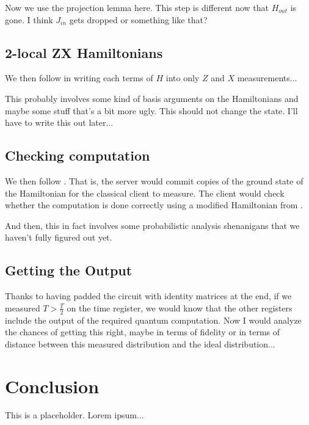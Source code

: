 \documentclass{article}
\theoremstyle{definition}
\begin{document}
Now we use the projection lemma here. This step is different now that $H_{out}$ is gone. I think $J_{in}$ gets dropped or something like that?

\subsection{2-local ZX Hamiltonians}

We then follow \cite{biamonte_love_2008} in writing each terms of $H$ into only $Z$ and $X$ measurements...

This probably involves some kind of basis arguments on the Hamiltonians and maybe some stuff that's a bit more ugly. This should not change the state. I'll have to write this out later...

\subsection{Checking computation}

We then follow \cite{mahadev_delegation}. That is, the server would commit copies of the ground state of the Hamiltonian for the classical client to measure. The client would check whether the computation is done correctly using a modified Hamiltonian from \cite{kempe_kitaev_regev_2006}. 

And then, this in fact involves some probabilistic analysis shenanigans that we haven't fully figured out yet.

\subsection{Getting the Output}

Thanks to having padded the circuit with identity matrices at the end, if we measured $T>\frac{T}{2}$ on the time register, we would know that the other registers include the output of the required quantum computation. Now I would analyze the chances of getting this right, maybe in terms of fidelity or in terms of distance between this measured distribution and the ideal distribution...

\section{Conclusion}

This is a placeholder. Lorem ipsum...



\end{document}
